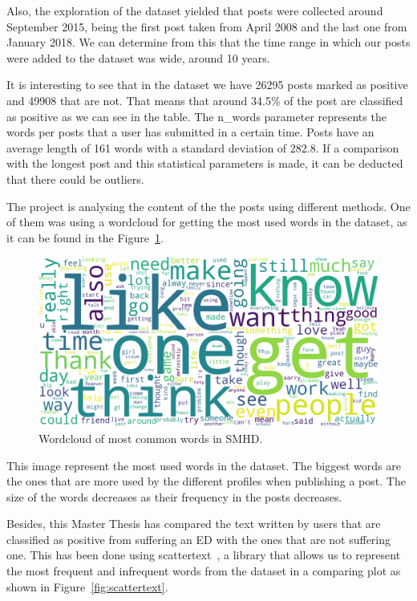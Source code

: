 Also, the exploration of the dataset yielded that  posts were collected around September 2015, being the first post taken from April 2008 and the last one from January 2018. We can determine from this that the time range in which our posts were added to the dataset was wide, around 10 years.

It is interesting to see that in the dataset we have 26295 posts marked as positive and 49908 that are not. That means that around 34.5\% of the post are classified as positive as we can see in the table. The n\_words parameter represents the words per posts that a user has submitted in a certain time. Posts have an average length of 161 words with a standard deviation of 282.8. If a comparison with the longest post and this statistical parameters is made, it can be deducted that there could be outliers.

The project is analysing the content of the the posts using different methods. One of them was using a wordcloud for getting the most used words in the dataset, as it can be found in the Figure~\ref{fig:SMHDwordcloud}.

\begin{figure}[!htp]
    \centering
    \includegraphics[scale=0.3]{img/detection/SMHD_wordcloud.png}
    \caption{Wordcloud of most common words in SMHD.}
    \label{fig:SMHDwordcloud}
\end{figure}

This image represent the most used words in the dataset. The biggest words are the ones that are more used by the different profiles when publishing a post. The size of the words decreases as their frequency in the posts decreases.

Besides, this Master Thesis has compared the text written by users that are classified as positive from suffering an ED with the ones that are not suffering one. This has been done using scattertext~\cite{JasonKes0:online}, a library that allows us to represent the most frequent and infrequent words from the dataset in a comparing plot as shown in Figure~\ref{fig:scattertext}.

